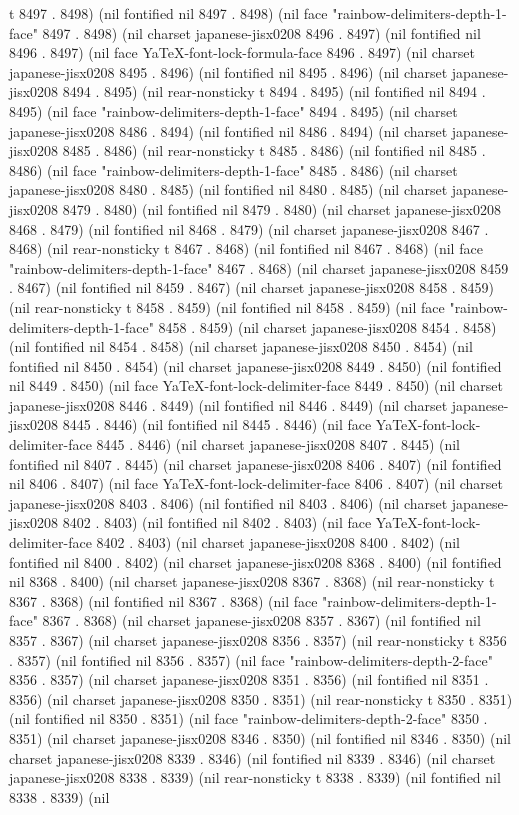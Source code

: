 t 8497 . 8498) (nil fontified nil 8497 . 8498) (nil face "rainbow-delimiters-depth-1-face" 8497 . 8498) (nil charset japanese-jisx0208 8496 . 8497) (nil fontified nil 8496 . 8497) (nil face YaTeX-font-lock-formula-face 8496 . 8497) (nil charset japanese-jisx0208 8495 . 8496) (nil fontified nil 8495 . 8496) (nil charset japanese-jisx0208 8494 . 8495) (nil rear-nonsticky t 8494 . 8495) (nil fontified nil 8494 . 8495) (nil face "rainbow-delimiters-depth-1-face" 8494 . 8495) (nil charset japanese-jisx0208 8486 . 8494) (nil fontified nil 8486 . 8494) (nil charset japanese-jisx0208 8485 . 8486) (nil rear-nonsticky t 8485 . 8486) (nil fontified nil 8485 . 8486) (nil face "rainbow-delimiters-depth-1-face" 8485 . 8486) (nil charset japanese-jisx0208 8480 . 8485) (nil fontified nil 8480 . 8485) (nil charset japanese-jisx0208 8479 . 8480) (nil fontified nil 8479 . 8480) (nil charset japanese-jisx0208 8468 . 8479) (nil fontified nil 8468 . 8479) (nil charset japanese-jisx0208 8467 . 8468) (nil rear-nonsticky t 8467 . 8468) (nil fontified nil 8467 . 8468) (nil face "rainbow-delimiters-depth-1-face" 8467 . 8468) (nil charset japanese-jisx0208 8459 . 8467) (nil fontified nil 8459 . 8467) (nil charset japanese-jisx0208 8458 . 8459) (nil rear-nonsticky t 8458 . 8459) (nil fontified nil 8458 . 8459) (nil face "rainbow-delimiters-depth-1-face" 8458 . 8459) (nil charset japanese-jisx0208 8454 . 8458) (nil fontified nil 8454 . 8458) (nil charset japanese-jisx0208 8450 . 8454) (nil fontified nil 8450 . 8454) (nil charset japanese-jisx0208 8449 . 8450) (nil fontified nil 8449 . 8450) (nil face YaTeX-font-lock-delimiter-face 8449 . 8450) (nil charset japanese-jisx0208 8446 . 8449) (nil fontified nil 8446 . 8449) (nil charset japanese-jisx0208 8445 . 8446) (nil fontified nil 8445 . 8446) (nil face YaTeX-font-lock-delimiter-face 8445 . 8446) (nil charset japanese-jisx0208 8407 . 8445) (nil fontified nil 8407 . 8445) (nil charset japanese-jisx0208 8406 . 8407) (nil fontified nil 8406 . 8407) (nil face YaTeX-font-lock-delimiter-face 8406 . 8407) (nil charset japanese-jisx0208 8403 . 8406) (nil fontified nil 8403 . 8406) (nil charset japanese-jisx0208 8402 . 8403) (nil fontified nil 8402 . 8403) (nil face YaTeX-font-lock-delimiter-face 8402 . 8403) (nil charset japanese-jisx0208 8400 . 8402) (nil fontified nil 8400 . 8402) (nil charset japanese-jisx0208 8368 . 8400) (nil fontified nil 8368 . 8400) (nil charset japanese-jisx0208 8367 . 8368) (nil rear-nonsticky t 8367 . 8368) (nil fontified nil 8367 . 8368) (nil face "rainbow-delimiters-depth-1-face" 8367 . 8368) (nil charset japanese-jisx0208 8357 . 8367) (nil fontified nil 8357 . 8367) (nil charset japanese-jisx0208 8356 . 8357) (nil rear-nonsticky t 8356 . 8357) (nil fontified nil 8356 . 8357) (nil face "rainbow-delimiters-depth-2-face" 8356 . 8357) (nil charset japanese-jisx0208 8351 . 8356) (nil fontified nil 8351 . 8356) (nil charset japanese-jisx0208 8350 . 8351) (nil rear-nonsticky t 8350 . 8351) (nil fontified nil 8350 . 8351) (nil face "rainbow-delimiters-depth-2-face" 8350 . 8351) (nil charset japanese-jisx0208 8346 . 8350) (nil fontified nil 8346 . 8350) (nil charset japanese-jisx0208 8339 . 8346) (nil fontified nil 8339 . 8346) (nil charset japanese-jisx0208 8338 . 8339) (nil rear-nonsticky t 8338 . 8339) (nil fontified nil 8338 . 8339) (nil 